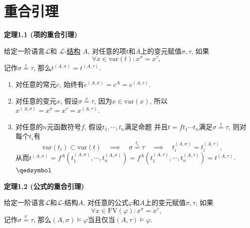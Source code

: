 


\setlength{\abovedisplayskip}{1pt}
\setlength{\belowdisplayskip}{1pt}

\section{重合引理}

\hypertarget{sec:定理1.1}{}
\noindent\textbf{定理1.1 (项的重合引理)}

给定一阶语言$\mathcal{L}$和
$\mathcal{L}$-\href{../01 一阶语言的结构/01 一阶语言的结构#nameddest=sec:定义1.1}
{结构} $A$, 对任意的项$t$和$A$上的变元赋值$\sigma,\tau$, 如果
\[
    \forall x\in\mathrm{var}(t):x^\sigma=x^\tau,
\]
记作$\sigma\overset{\displaystyle t}{=}\tau$, 那么$t^{(A,\sigma)}=t^{(A,\tau)}$.


\begin{enumerate}
    \item 对任意的常元$c$, 始终有$c^{(A,\sigma)}=c^A=c^{(A,\tau)}$.
    \item 对任意的变元$x$, 假设$\sigma\overset{\displaystyle x}{=}\tau$,
    因为$x\in\mathrm{var}(x)$, 所以$x^{(A,\sigma)}=x^\sigma=x^\tau=x^{(A,\tau)}$.
    \item 对任意的$n$元函数符号$f$, 假设$t_1,\cdots,t_n$满足命题
    并且$t=ft_1\cdots t_n$满足$\sigma\overset{\displaystyle t}{=}\tau$,
    则对每个$t_i$有
    \vspace{3pt}
    \[
        \mathrm{var}(t_i)\subset\mathrm{var}(t)
        \quad\implies\quad\sigma\overset{\displaystyle t_i}{=}\tau
        \quad\implies\quad t_i^{(A,\sigma)}=t_i^{(A,\tau)},
    \]
    从而$t^{(A,\sigma)}=f^A(t_1^{(A,\sigma)},\cdots,t_n^{(A,\sigma)})
    =f^A(t_1^{(A,\tau)},\cdots,t_n^{(A,\tau)})=t^{(A,\tau)}$. \hfill $\qedsymbol$
\end{enumerate}

\vspace{10pt}

\hypertarget{sec:定理1.2}{}
\noindent\textbf{定理1.2 (公式的重合引理)}

给定一阶语言$\mathcal{L}$和$\mathcal{L}$-结构$A$,
对任意的公式$\varphi$和$A$上的变元赋值$\sigma,\tau$, 如果
\[
    \forall x\in\mathrm{FV}(\varphi):x^\sigma=x^\tau,
\]
记作$\sigma\overset{\displaystyle\varphi}{=}\tau$,
那么$(A,\sigma)\models\varphi$当且仅当$(A,\tau)\models\varphi$.


